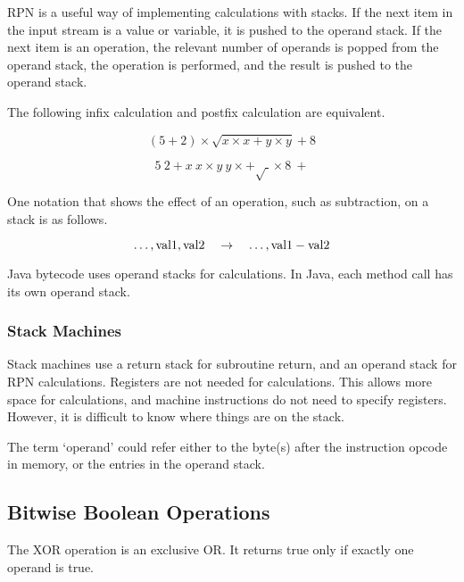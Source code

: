 RPN is a useful way of implementing calculations with stacks.
If the next item in the input stream is a value or variable, it is pushed to the operand stack.
If the next item is an operation, the relevant number of operands is popped from the operand stack, the operation is performed, and the result is pushed to the operand stack.

The following infix calculation and postfix calculation are equivalent.

\begin{equation*}
  \left( 5 + 2 \right) \times \sqrt{ x \times x + y \times y } + 8
\end{equation*}

\begin{equation*}
  5 \> 2 + x \> x \times y \> y \times + \sqrt{\>} \times 8 \> +
\end{equation*}

One notation that shows the effect of an operation, such as subtraction, on a stack is as follows.

\begin{equation*}
  \ldots, \textnormal{val1}, \textnormal{val2} \quad \rightarrow \quad \ldots, \textnormal{val1} - \textnormal{val2}
\end{equation*}

Java bytecode uses operand stacks for calculations.
In Java, each method call has its own operand stack.

\subsubsection{Stack Machines}

Stack machines use a return stack for subroutine return, and an operand stack for RPN calculations.
Registers are not needed for calculations.
This allows more space for calculations, and machine instructions do not need to specify registers.
However, it is difficult to know where things are on the stack.

The term `operand' could refer either to the byte(s) after the instruction opcode in memory, or the entries in the operand stack.

\subsection{Bitwise Boolean Operations}

The XOR operation is an exclusive OR\@.
It returns true only if exactly one operand is true.


